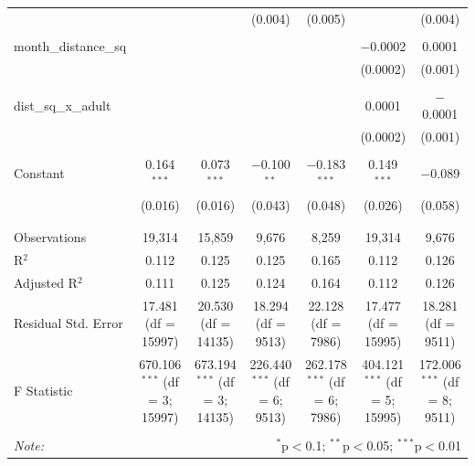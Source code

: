 \documentclass{beamer}
\begin{document}
\begin{frame}
\begin{table}[!htbp]
{\begin{tabular}{@{\extracolsep{5pt}}lcccccc}
			&  &  & (0.004) & (0.005) &  & (0.004) \\ 
			& & & & & & \\ 
			month\_distance\_sq &  &  &  &  & $-$0.0002 & 0.0001 \\ 
			&  &  &  &  & (0.0002) & (0.001) \\ 
			& & & & & & \\ 
			dist\_sq\_x\_adult &  &  &  &  & 0.0001 & $-$0.0001 \\ 
			&  &  &  &  & (0.0002) & (0.001) \\ 
			& & & & & & \\ 
			Constant & 0.164$^{***}$ & 0.073$^{***}$ & $-$0.100$^{**}$ & $-$0.183$^{***}$ & 0.149$^{***}$ & $-$0.089 \\ 
			& (0.016) & (0.016) & (0.043) & (0.048) & (0.026) & (0.058) \\ 
			& & & & & & \\ 
			\hline \\[-1.8ex] 
			Observations & 19,314 & 15,859 & 9,676 & 8,259 & 19,314 & 9,676 \\ 
			R$^{2}$ & 0.112 & 0.125 & 0.125 & 0.165 & 0.112 & 0.126 \\ 
			Adjusted R$^{2}$ & 0.111 & 0.125 & 0.124 & 0.164 & 0.112 & 0.126 \\ 
			Residual Std. Error & 17.481 (df = 15997) & 20.530 (df = 14135) & 18.294 (df = 9513) & 22.128 (df = 7986) & 17.477 (df = 15995) & 18.281 (df = 9511) \\ 
			F Statistic & 670.106$^{***}$ (df = 3; 15997) & 673.194$^{***}$ (df = 3; 14135) & 226.440$^{***}$ (df = 6; 9513) & 262.178$^{***}$ (df = 6; 7986) & 404.121$^{***}$ (df = 5; 15995) & 172.006$^{***}$ (df = 8; 9511) \\ 
			\hline 
			\hline \\[-1.8ex] 
			\textit{Note:}  & \multicolumn{6}{r}{$^{*}$p$<$0.1; $^{**}$p$<$0.05; $^{***}$p$<$0.01} \\ 
		\end{tabular} }
	\end{table} 
\end{frame}
\end{document}
